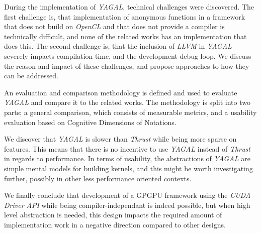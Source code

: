 During the implementation of \textit{YAGAL}, technical challenges were discovered. The first challenge is, that implementation of anonymous functions in a framework that does not build on \textit{OpenCL} and that does not provide a compiler is technically difficult, and none of the related works has an implementation that does this. The second challenge is, that the inclusion of \textit{LLVM} in \textit{YAGAL} severely impacts compilation time, and the development-debug loop. We discuss the reason and impact of these challenges, and propose approaches to how they can be addressed.

An evaluation and comparison methodology is defined and used to evaluate \textit{YAGAL} and compare it to the related works. The methodology is split into two parts; a general comparison, which consists of  measurable metrics, and a usability evaluation based on Cognitive Dimensions of Notations. 

We discover that \textit{YAGAL} is slower than \textit{Thrust} while being more sparse on features. This means that there is no incentive to use \textit{YAGAL} instead of \textit{Thrust} in regards to performance. In terms of usability, the abstractions of \textit{YAGAL} are simple mental models for building kernels, and this might be worth investigating further, possibly in other less performance oriented contexts.

We finally conclude that development of a GPGPU framework using the \textit{CUDA Driver API} while being compiler-independant is indeed possible, but when high level abstraction is needed, this design impacts the required amount of implementation work in a negative direction compared to other designs. 

